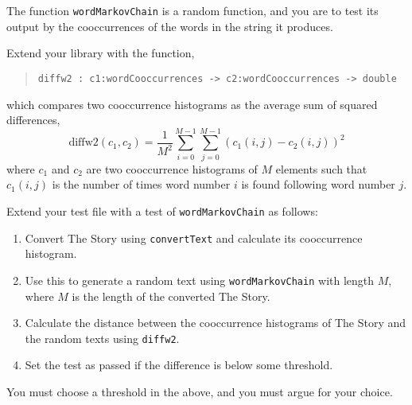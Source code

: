 \label{diff}
The function \lstinline{wordMarkovChain} is a random function, and
you are to test its output by the cooccurrences of the words in
the string it produces.

Extend your library with the function,
\begin{quote}
  \mbox{\lstinline!diffw2 : c1:wordCooccurrences -> c2:wordCooccurrences -> double!}
\end{quote}
which compares two cooccurrence histograms as the average sum of squared differences,
\begin{equation}
  \text{diffw2}(c_1, c_2) = \frac{1}{M^2}\sum_{i=0}^{M-1}\sum_{j=0}^{M-1}\left(c_1(i,j) - c_2(i,j)\right)^2
\end{equation}
where $c_1$ and $c_2$ are two cooccurrence histograms of $M$ elements
such that $c_1(i,j)$ is the number of times word number $i$ is
found following word number $j$.

Extend your test file with a test of \lstinline{wordMarkovChain}
as follows:
\begin{enumerate}
\item Convert The Story using \lstinline{convertText} and calculate
  its cooccurrence histogram.
\item Use this to generate a random text using \lstinline{wordMarkovChain}
  with length $M$, where $M$ is the length of the converted The Story.
\item Calculate the distance between the cooccurrence histograms of
  The Story and the random texts using \lstinline{diffw2}.
\item Set the test as passed if the difference is below some threshold.
\end{enumerate}
You must choose a threshold in the above, and you must argue for your choice.
